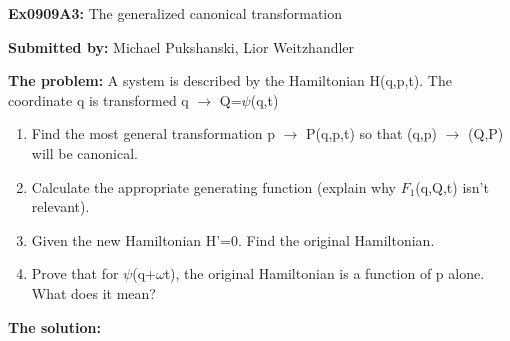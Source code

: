 \documentclass[11pt,fleqn]{article}
\newcommand{\Dn}{\vspace*{3mm}}
\newcommand{\exnumber}[1]{\newcommand{\exnum}{#1}}
\newcommand{\heading}[1]{\begin{center} {\Large {\bf Ex\exnum:} #1} \end{center}}
\newcommand{\auname}[1]{\begin{center} {\bf Submitted by:} #1 \end{center}}
\begin{document}

\exnumber{0909A3}
\heading{The generalized canonical transformation} 
\auname{Michael Pukshanski, Lior Weitzhandler}


{\bf The problem:}
\Dn
A system is described by the Hamiltonian H(q,p,t). The coordinate q is transformed q $\to$ Q=$\psi$(q,t)
\begin{enumerate}
\item Find the most general transformation p $\to$ P(q,p,t) so that (q,p) $\to$ (Q,P) will be canonical.
\item Calculate the appropriate generating function (explain why $F_1$(q,Q,t) isn't relevant).
\item Given the new Hamiltonian H'=0. Find the original Hamiltonian.
\item Prove that for $\psi$(q+$\omega$t), the original Hamiltonian is a function of p alone. What does it mean?
\end{enumerate}
\Dn\Dn


{\bf The solution:}
\end{document}
